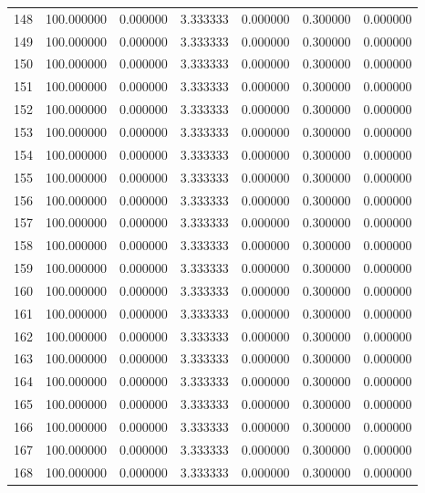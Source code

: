 \begin{tabular}{rrrrrrr}
148 & 100.000000 &    0.000000 &  3.333333 &   0.000000 &   0.300000 &  0.000000 \\
149 & 100.000000 &    0.000000 &  3.333333 &   0.000000 &   0.300000 &  0.000000 \\
150 & 100.000000 &    0.000000 &  3.333333 &   0.000000 &   0.300000 &  0.000000 \\
151 & 100.000000 &    0.000000 &  3.333333 &   0.000000 &   0.300000 &  0.000000 \\
152 & 100.000000 &    0.000000 &  3.333333 &   0.000000 &   0.300000 &  0.000000 \\
153 & 100.000000 &    0.000000 &  3.333333 &   0.000000 &   0.300000 &  0.000000 \\
154 & 100.000000 &    0.000000 &  3.333333 &   0.000000 &   0.300000 &  0.000000 \\
155 & 100.000000 &    0.000000 &  3.333333 &   0.000000 &   0.300000 &  0.000000 \\
156 & 100.000000 &    0.000000 &  3.333333 &   0.000000 &   0.300000 &  0.000000 \\
157 & 100.000000 &    0.000000 &  3.333333 &   0.000000 &   0.300000 &  0.000000 \\
158 & 100.000000 &    0.000000 &  3.333333 &   0.000000 &   0.300000 &  0.000000 \\
159 & 100.000000 &    0.000000 &  3.333333 &   0.000000 &   0.300000 &  0.000000 \\
160 & 100.000000 &    0.000000 &  3.333333 &   0.000000 &   0.300000 &  0.000000 \\
161 & 100.000000 &    0.000000 &  3.333333 &   0.000000 &   0.300000 &  0.000000 \\
162 & 100.000000 &    0.000000 &  3.333333 &   0.000000 &   0.300000 &  0.000000 \\
163 & 100.000000 &    0.000000 &  3.333333 &   0.000000 &   0.300000 &  0.000000 \\
164 & 100.000000 &    0.000000 &  3.333333 &   0.000000 &   0.300000 &  0.000000 \\
165 & 100.000000 &    0.000000 &  3.333333 &   0.000000 &   0.300000 &  0.000000 \\
166 & 100.000000 &    0.000000 &  3.333333 &   0.000000 &   0.300000 &  0.000000 \\
167 & 100.000000 &    0.000000 &  3.333333 &   0.000000 &   0.300000 &  0.000000 \\
168 & 100.000000 &    0.000000 &  3.333333 &   0.000000 &   0.300000 &  0.000000 \\

\end{tabular}
